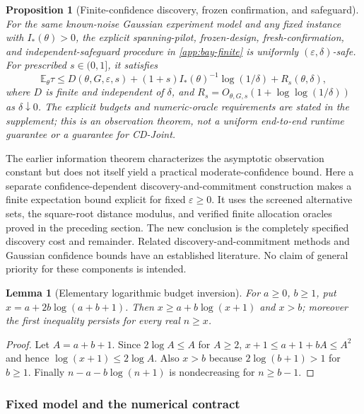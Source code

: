 \documentclass{article}
\theoremstyle{plain}
\newtheorem{proposition}[theorem]{Proposition}
\newtheorem{lemma}[theorem]{Lemma}
\theoremstyle{definition}
\begin{document}
\begin{proposition}[Finite-confidence discovery, frozen confirmation, and safeguard]
\label{prop:bay-finite}
For the same known-noise Gaussian experiment model and any fixed instance with $I_*(\theta)>0$, the explicit spanning-pilot, frozen-design, fresh-confirmation, and independent-safeguard procedure in \cref{app:bay-finite} is uniformly $(\varepsilon,\delta)$-safe. For prescribed $s\in(0,1]$, it satisfies
\begin{equation}
\mathbb E_\theta\tau\le D(\theta,G,\varepsilon,s)+(1+s)I_*(\theta)^{-1}\log(1/\delta)+R_s(\theta,\delta),
\label{eq:bay-finite-main}
\end{equation}
where $D$ is finite and independent of $\delta$, and $R_s=O_{\theta,G,s}(1+\log\log(1/\delta))$ as $\delta\downarrow0$. The explicit budgets and numeric-oracle requirements are stated in the supplement; this is an \emph{observation} theorem, not a uniform end-to-end runtime guarantee or a guarantee for CD-Joint.
\end{proposition}

The earlier information theorem characterizes the asymptotic observation
constant but does not itself yield a practical moderate-confidence bound.
Here a separate confidence-dependent discovery-and-commitment construction
makes a finite expectation bound explicit for fixed $\varepsilon\ge0$.
It uses the screened alternative sets, the square-root distance modulus,
and verified finite allocation oracles proved in the preceding section.  The new conclusion is the completely
specified discovery cost and remainder.  Related discovery-and-commitment methods and Gaussian confidence bounds
have an established literature. No claim of general priority for these
components is intended.

\begin{lemma}[Elementary logarithmic budget inversion]
\label{lem:bay-fc-inversion}
For $a\ge0$, $b\ge1$, put $x=a+2b\log(a+b+1)$.
Then $x\ge a+b\log(x+1)$ and $x>b$; moreover the first inequality
persists for every real $n\ge x$.
\end{lemma}
\begin{proof}
Let $A=a+b+1$. Since $2\log A\le A$ for $A\ge2$,
$x+1\le a+1+bA\le A^2$ and hence
$\log(x+1)\le2\log A$. Also $x>b$ because
$2\log(b+1)>1$ for $b\ge1$. Finally
$n-a-b\log(n+1)$ is nondecreasing for $n\ge b-1$.
\end{proof}

\subsubsection{Fixed model and the numerical contract}
\end{document}

